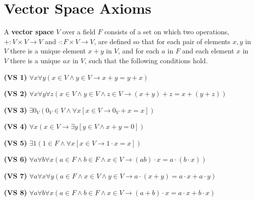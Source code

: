 \documentclass[12pt, a4paper]{article}
\begin{document}
 
 \section{Vector Space Axioms}
 
 \noindent A \textbf{vector space} $V$ over a field $F$ consists of a set on which two operations, $+\colon V\times V\rightarrow V$ and $\cdot\colon F\times V\rightarrow V$, are defined so that for each pair of elements $x,y$ in $V$ there is a unique element $x+y$ in $V$, and for each $a$ in $F$ and each element $x$ in $V$ there is a unique $ax$ in $V$, such that the following conditions hold.
 
 \vspace{4mm}
 
 \begin{addmargin}[1.5em]{1.5em}
 
    \textbf{(VS 1)} $\forall x\forall y(x\in V\wedge y\in V\rightarrow x+y=y+x)$
    
    \vspace{4mm}
    
    \noindent\textbf{(VS 2)} $\forall x\forall y\forall z(x\in V\wedge y\in V\wedge z\in V\rightarrow (x+y)+z=x+(y+z))$
    
    \vspace{4mm}
    
    \noindent\textbf{(VS 3)} $\exists 0_V(0_V\in V\wedge\forall x[x\in V\rightarrow 0_V+x=x])$
    
    \vspace{4mm}
    
    \noindent\textbf{(VS 4)} $\forall x(x\in V\rightarrow\exists y[y\in V\wedge x+y=0])$
    
    \vspace{4mm}
    
    \noindent\textbf{(VS 5)} $\exists 1(1\in F\wedge\forall x[x\in V\rightarrow 1\cdot x=x])$
    
    \vspace{4mm}
    
    \noindent\textbf{(VS 6)} $\forall a\forall b\forall x(a\in F\wedge b\in F\wedge x\in V\rightarrow (ab)\cdot x=a\cdot(b\cdot x))$
    
    \vspace{4mm}
    
    \noindent\textbf{(VS 7)} $\forall a\forall x\forall y(a\in F\wedge x\in V\wedge y\in V\rightarrow a\cdot(x+y)=a\cdot x+a\cdot y)$
    
    \vspace{4mm}
    
    \noindent\textbf{(VS 8)} $\forall a\forall b\forall x(a\in F\wedge b\in F\wedge x\in V\rightarrow (a+b)\cdot x=a\cdot x+b\cdot x)$
 
 \end{addmargin}
 
\end{document}
